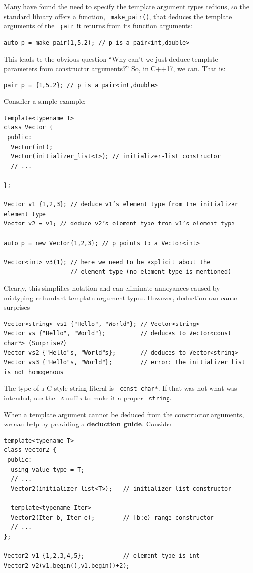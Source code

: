 \documentclass[11pt]{article}
\let\OldTexttt\texttt
\renewcommand{\texttt}[1]{\OldTexttt{\color{MidnightBlue} #1}}
\begin{document}
Many have found the need to specify the template argument types tedious, so the standard library
offers a function, \texttt{make\_pair()}, that deduces the template arguments of the \texttt{pair} it returns from
its function arguments:
\begin{verbatim}
auto p = make_pair(1,5.2); // p is a pair<int,double>
\end{verbatim}
This leads to the obvious question ``Why can’t we just deduce template parameters from
constructor arguments?'' So, in C++17, we can. That is:
\begin{verbatim}
pair p = {1,5.2}; // p is a pair<int,double>
\end{verbatim}

Consider a simple example:
\begin{verbatim}
template<typename T>
class Vector {
 public:
  Vector(int);
  Vector(initializer_list<T>); // initializer-list constructor
  // ...
  
};

Vector v1 {1,2,3}; // deduce v1’s element type from the initializer element type
Vector v2 = v1; // deduce v2’s element type from v1’s element type

auto p = new Vector{1,2,3}; // p points to a Vector<int>

Vector<int> v3(1); // here we need to be explicit about the
                   // element type (no element type is mentioned)
\end{verbatim}

Clearly, this simplifies notation and can eliminate annoyances caused by mistyping redundant
template argument types. However, deduction can cause surprises
\begin{verbatim}
Vector<string> vs1 {"Hello", "World"}; // Vector<string>
Vector vs {"Hello", "World"};          // deduces to Vector<const char*> (Surprise?)
Vector vs2 {"Hello"s, "World"s};       // deduces to Vector<string>
Vector vs3 {"Hello"s, "World"};        // error: the initializer list is not homogenous
\end{verbatim}
The type of a C-style string literal is \texttt{const char*}. If that was not what was intended, use the
\texttt{s} suffix to make it a proper \texttt{string}.

When a template argument cannot be deduced from the constructor arguments, we can help by
providing a \textbf{deduction guide}. Consider
\begin{verbatim}
template<typename T>
class Vector2 {
 public:
  using value_type = T;
  // ...
  Vector2(initializer_list<T>);   // initializer-list constructor
  
  template<typename Iter>
  Vector2(Iter b, Iter e);        // [b:e) range constructor
  // ...
};

Vector2 v1 {1,2,3,4,5};           // element type is int
Vector2 v2(v1.begin(),v1.begin()+2);
\end{verbatim}
\end{document}
